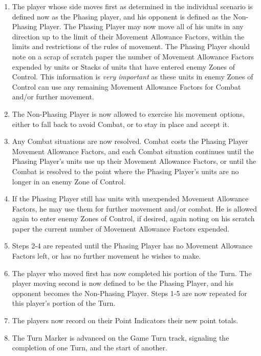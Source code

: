 \begin{enumerate}
  \item The player whose side moves first as determined in the individual scenario is defined now as the Phasing player, and his opponent is defined as the Non-Phasing Player. The Phasing Player may now move all of his units in any direction up to the limit of their Movement Allowance Factors, within the limits and restrictions of the rules of movement. The Phasing Player should note on a scrap of scratch paper the number of Movement Allowance Factors expended by units or Stacks of units that have entered enemy Zones of Control. This information is \textit{very important} as these units in enemy Zones of Control can use any remaining Movement Allowance Factors for Combat and/or further movement.

  \item The Non-Phasing Player is now allowed to exercise his movement options, either to fall back to avoid Combat, or to stay in place and accept it.

  \item Any Combat situations are now resolved. Combat costs the Phasing Player Movement Allowance Factors, and each Combat situation continues until the Phasing Player's units use up their Movement Allowance Factors, or until the Combat is resolved to the point where the Phasing Player's units are no longer in an enemy Zone of Control.

  \item If the Phasing Player still has units with unexpended Movement Allowance Factors, he may use them for further movement and/or combat. He is allowed again to enter enemy Zones of Control, if desired, again noting on his scratch paper the current number of Movement Allowance Factors expended.

  \item Steps 2-4 are repeated until the Phasing Player has no Movement Allowance Factors left, or has no further movement he wishes to make.

  \item The player who moved first has now completed his portion of the Turn. The player moving second is now defined to be the Phasing Player, and his opponent becomes the Non-Phasing Player. Steps 1-5 are now repeated for this player's portion of the Turn.

  \item The players now record on their Point Indicators their new point totals.

  \item The Turn Marker is advanced on the Game Turn track, signaling the completion of one Turn, and the start of another.
\end{enumerate}

